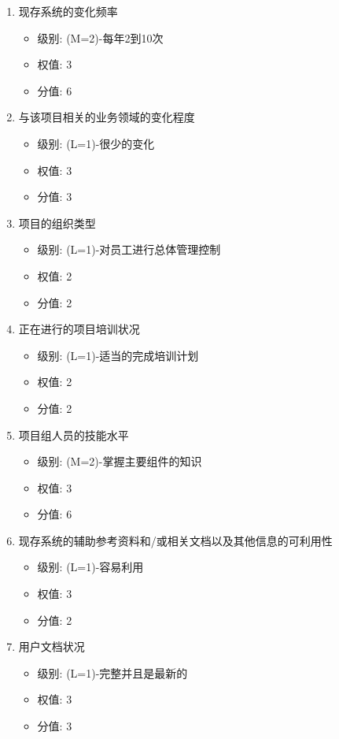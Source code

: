 \documentclass[hyperref, a4paper]{ctexart}
\providecommand{\tightlist}{%
  \setlength{\itemsep}{0pt}\setlength{\parskip}{0pt}}
\begin{document}
\begin{enumerate}
\def\labelenumi{\arabic{enumi}.}
\tightlist
\item
  现存系统的变化频率

  \begin{itemize}
  \tightlist
  \item
    级别: (M=2)-每年2到10次
  \item
    权值: 3
  \item
    分值: 6
  \end{itemize}
\item
  与该项目相关的业务领域的变化程度

  \begin{itemize}
  \tightlist
  \item
    级别: (L=1)-很少的变化
  \item
    权值: 3
  \item
    分值: 3
  \end{itemize}
\item
  项目的组织类型

  \begin{itemize}
  \tightlist
  \item
    级别: (L=1)-对员工进行总体管理控制
  \item
    权值: 2
  \item
    分值: 2
  \end{itemize}
\item
  正在进行的项目培训状况

  \begin{itemize}
  \tightlist
  \item
    级别: (L=1)-适当的完成培训计划
  \item
    权值: 2
  \item
    分值: 2
  \end{itemize}
\item
  项目组人员的技能水平

  \begin{itemize}
  \tightlist
  \item
    级别: (M=2)-掌握主要组件的知识
  \item
    权值: 3
  \item
    分值: 6
  \end{itemize}
\item
  现存系统的辅助参考资料和/或相关文档以及其他信息的可利用性

  \begin{itemize}
  \tightlist
  \item
    级别: (L=1)-容易利用
  \item
    权值: 3
  \item
    分值: 2
  \end{itemize}
\item
  用户文档状况

  \begin{itemize}
  \tightlist
  \item
    级别: (L=1)-完整并且是最新的
  \item
    权值: 3
  \item
    分值: 3
  \end{itemize}
\end{enumerate}
\end{document}
